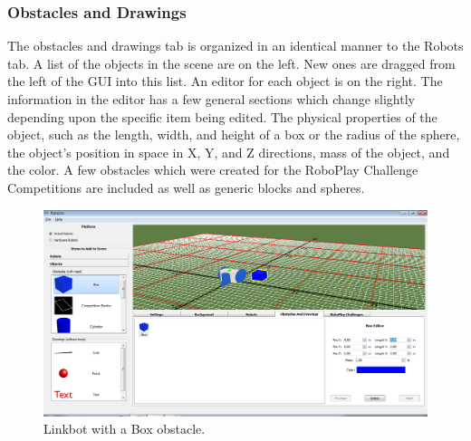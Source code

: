 \documentclass{article}
\begin{document}
\subsubsection{Obstacles and Drawings}
The obstacles and drawings tab is organized in an identical manner to the Robots
tab.  A list of the objects in the scene are on the left.  New ones are dragged
from the left of the GUI into this list.  An editor for each object is on the
right.  The information in the editor has a few general sections which change
slightly depending upon the specific item being edited.  The physical properties
of the object, such as the length, width, and height of a box or the radius of
the sphere, the object's position in space in X, Y, and Z directions, mass of
the object, and the color.  A few obstacles which were created for the RoboPlay
Challenge Competitions are included as well as generic blocks and spheres.
\begin{figure}[H]
	\begin{center}
		\includegraphics[width=6in]{pictures/gui_obstacles}
	\end{center}
	\caption{Linkbot with a Box obstacle.}
	\label{fig:obstacle}
\end{figure}
\end{document}
